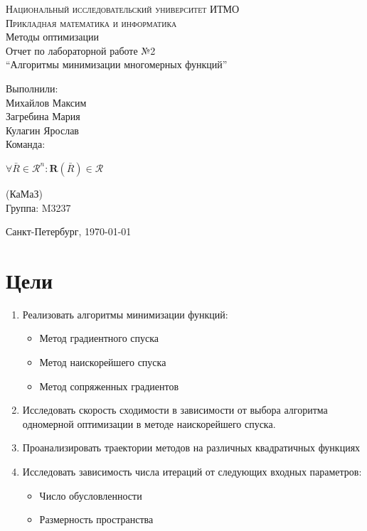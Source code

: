 



\begin{titlepage}
	\begin{center}
		\textsc{Национальный исследовательский университет ИТМО\\
			Прикладная математика и информатика}\\[5cm]

		\huge{Методы оптимизации\\[6mm]
			\large Отчет по лабораторной работе №2\\
			``Алгоритмы минимизации многомерных функций''\\[4cm]

		}
	\end{center}

	\begin{flushright}
		\begin{minipage}{0.25\textwidth}
			Выполнили:\\[2mm]
			Михайлов Максим\\
			Загребина Мария\\
			Кулагин Ярослав\\[2mm]
			Команда:

			\(\forall \bar R \in \mathscr{R}^n : \mathrm{\textbf{R}}(\bar R) \in \mathscr{R}\)

			(КаМаЗ)\\[2mm]
			Группа: M3237
		\end{minipage}
	\end{flushright}

	\vfill
	\begin{center}
		Санкт-Петербург, \today
	\end{center}
\end{titlepage}



\section{Цели}
\begin{enumerate}
	\item Реализовать алгоритмы минимизации функций:
	      \begin{itemize}
		      \item Метод градиентного спуска
		      \item Метод наискорейшего спуска
		      \item Метод сопряженных градиентов
	      \end{itemize}
	\item Исследовать скорость сходимости в зависимости от выбора алгоритма одномерной оптимизации в методе наискорейшего спуска.
	\item Проанализировать траектории методов на различных квадратичных функциях
	\item Исследовать зависимость числа итераций от следующих входных параметров:
	      \begin{itemize}
		      \item Число обусловленности
		      \item Размерность пространства
	      \end{itemize}
\end{enumerate}


